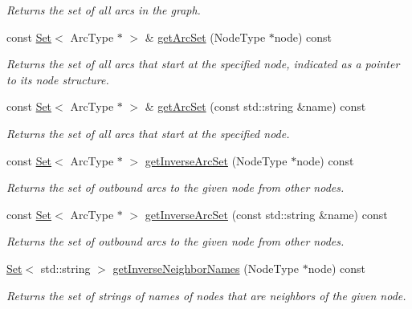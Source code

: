 \begin{DoxyCompactItemize}
\begin{DoxyCompactList}\small\item\em Returns the set of all arcs in the graph. \end{DoxyCompactList}\item 
const \mbox{\hyperlink{classSet}{Set}}$<$ Arc\+Type $\ast$ $>$ \& \mbox{\hyperlink{classGraph_a17cfc7f4d8c738fc6f51813f50be6400}{get\+Arc\+Set}} (Node\+Type $\ast$node) const
\begin{DoxyCompactList}\small\item\em Returns the set of all arcs that start at the specified node, indicated as a pointer to its node structure. \end{DoxyCompactList}\item 
const \mbox{\hyperlink{classSet}{Set}}$<$ Arc\+Type $\ast$ $>$ \& \mbox{\hyperlink{classGraph_a31b9e2056ee2d66a7ea9feb02f016e8d}{get\+Arc\+Set}} (const std\+::string \&name) const
\begin{DoxyCompactList}\small\item\em Returns the set of all arcs that start at the specified node. \end{DoxyCompactList}\item 
const \mbox{\hyperlink{classSet}{Set}}$<$ Arc\+Type $\ast$ $>$ \mbox{\hyperlink{classGraph_ad5fd149800cd46aae497b05b46059b63}{get\+Inverse\+Arc\+Set}} (Node\+Type $\ast$node) const
\begin{DoxyCompactList}\small\item\em Returns the set of outbound arcs to the given node from other nodes. \end{DoxyCompactList}\item 
const \mbox{\hyperlink{classSet}{Set}}$<$ Arc\+Type $\ast$ $>$ \mbox{\hyperlink{classGraph_a2cfe12e71ca594736a1e329461cff024}{get\+Inverse\+Arc\+Set}} (const std\+::string \&name) const
\begin{DoxyCompactList}\small\item\em Returns the set of outbound arcs to the given node from other nodes. \end{DoxyCompactList}\item 
\mbox{\hyperlink{classSet}{Set}}$<$ std\+::string $>$ \mbox{\hyperlink{classGraph_aa9eceee00e824ea4852449fa3de61e82}{get\+Inverse\+Neighbor\+Names}} (Node\+Type $\ast$node) const
\begin{DoxyCompactList}\small\item\em Returns the set of strings of names of nodes that are neighbors of the given node. \end{DoxyCompactList}\item 

\end{DoxyCompactItemize}
